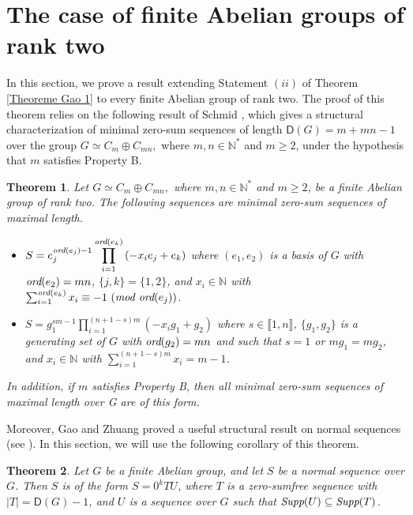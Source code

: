 \documentclass[english,12pt,a4paper,twoside]{smfart}
\theoremstyle{plain}
\newtheorem{theorem}{Theorem}[section]
\theoremstyle{definition}
\theoremstyle{remark}
\begin{document}
\section{The case of finite Abelian groups of rank two}\label{Section groupes de rang deux}
In this section, we prove a result extending Statement $(ii)$ of Theorem \ref{Theoreme Gao 1} to every finite Abelian group of rank two. The proof of this theorem relies on the following result of Schmid \cite{Wolfgang}, which gives a structural characterization of minimal zero-sum sequences of length $\mathsf{D}(G) = m + mn -1$ over the group $G \simeq C_{m} \oplus C_{mn},$ where $m,n \in \mathbb{N}^*$ and $m \geq 2$, under the hypothesis that $m$ satisfies Property B.
\begin{theorem}\label{Wolfgang} Let $G \simeq C_{m} \oplus C_{mn},$ where $m,n \in \mathbb{N}^*$ and $m \geq 2$, be a finite Abelian group of rank two. The following sequences are minimal zero-sum sequences of maximal length.

\begin{itemize}
\item[$(i)$] 
$S = e^{\text{\em ord\em}(e_j)-1}_j \displaystyle\prod^{\text{\em ord\em}(e_k)}_{i=1} \left(-x_ie_j + e_k\right)$ 
where $(e_1,e_2)$ is a basis of $G$ with $\text{\em ord\em}(e_2) = mn$, $\{j,k\}=\{1,2\}$, and $x_i \in \mathbb{N}$ with $\sum^{\text{\em ord\em}(e_k)}_{i=1} x_i \equiv -1 \text{ } (\text{\em mod \em} \text{\em ord\em}(e_j))$.

\item[$(ii)$] $S = g^{sm-1}_1 \displaystyle\prod^{(n+1-s)m}_{i=1} \left(-x_ig_1 + g_2\right)$ where $s \in \llbracket 1,n \rrbracket$, $\{g_1, g_2\}$ is a generating set of $G$ with $\text{\em ord\em}(g_2) = mn$ and such that $s=1$ or $mg_1 = mg_2$,
and $x_i \in \mathbb{N}$ with $\sum^{(n+1-s)m}_{i=1} x_i = m - 1$.
\end{itemize}

In addition, if $m$ satisfies Property B, then all minimal zero-sum sequences of maximal
length over G are of this form.
\end{theorem}

Moreover, Gao and Zhuang proved a useful structural result on normal sequences (see \cite[Theorem $1.2$]{Gao06}). In this section, we will use the following corollary of this theorem.
\begin{theorem}\label{Gao}
Let $G$ be a finite Abelian group, and let $S$ be a normal sequence over $G$. Then $S$ is of the form $S=0^{k}TU$, where $T$ is a zero-sumfree sequence with $\left|T\right|=\mathsf{D}(G)-1$, and $U$ is a sequence over $G$ such that $\text{\em Supp\em}(U) \subseteq \text{\em Supp\em}(T)$.
\end{theorem}
\end{document}
